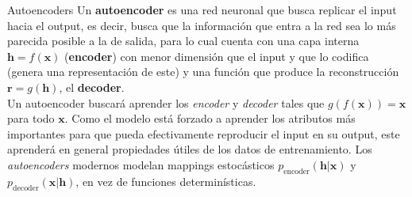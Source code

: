 \documentclass[9pt]{beamer}
\begin{document}
\begin{frame}{Autoencoders}
Un \textbf{autoencoder} es una red neuronal que busca replicar el input hacia el output, es decir, busca que la información que entra a la red sea lo más parecida posible a la de salida, para lo cual cuenta con una capa interna $\bm{h} = f(\bm{x})$ (\textbf{encoder}) con menor dimensión que el input y que lo codifica (genera una representación de este) y una función que produce la reconstrucción $\bm{r} = g(\bm{h})$, el \textbf{decoder}. \pause \\

Un autoencoder buscará aprender los \textit{encoder} y \textit{decoder} tales que $g(f(\bm{x})) = \bm{x}$ para todo $\bm{x}$. Como el modelo está forzado a aprender los atributos más importantes para que pueda efectivamente reproducir el input en su output, este aprenderá en general propiedades útiles de los datos de entrenamiento. Los \textit{autoencoders} modernos modelan mappings estocásticos $p_{\textrm{encoder}}(\bm{h}|\bm{x})$ y $p_{\textrm{decoder}}(\bm{x}|\bm{h})$, en vez de funciones determinísticas. \pause

\begin{figure}[H]
\captionsetup{font=small,labelfont=small}
\centering
{}
\end{figure}

\end{frame}
\end{document}
